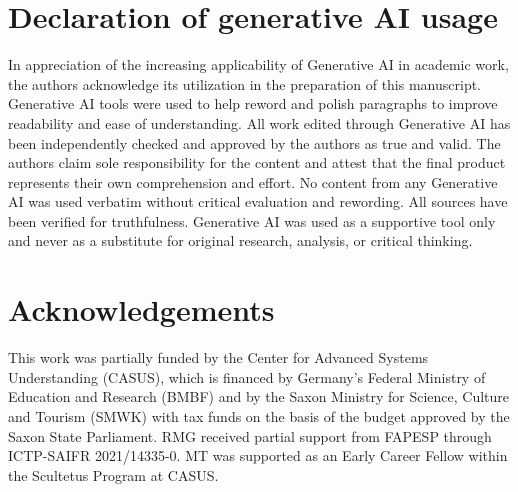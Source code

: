 \documentclass[11pt, a4paper]{article}
\theoremstyle{break}
\theoremstyle{break}
\theoremstyle{break}
\theoremstyle{break}
\theoremstyle{break}
\theoremstyle{break}
\theoremstyle{break}
\theoremstyle{break}
\theoremstyle{break}
\theoremstyle{break}
\begin{document}
\section*{Declaration of generative AI usage}
In appreciation of the increasing applicability of Generative AI in academic work, the authors acknowledge its utilization in the preparation of this manuscript. Generative AI tools were used to help reword and polish paragraphs to improve readability and ease of understanding. All work edited through Generative AI has been independently checked and approved by the authors as true and valid. The authors claim sole responsibility for the content and attest that the final product represents their own comprehension and effort. No content from any Generative AI was used verbatim without critical evaluation and rewording. All sources have been verified for truthfulness. Generative AI was used as a supportive tool only and never as a substitute for original research, analysis, or critical thinking.

\section*{Acknowledgements}
This work was partially funded by the Center for Advanced Systems Understanding (CASUS), which is financed by Germany’s Federal Ministry of Education and Research (BMBF) and by the Saxon Ministry for Science, Culture and Tourism (SMWK) with tax funds on the basis of the budget approved by the Saxon State Parliament. RMG received partial support from FAPESP through ICTP-SAIFR 2021/14335-0. MT was supported as an Early Career Fellow within the Scultetus Program at CASUS.



\end{document}
